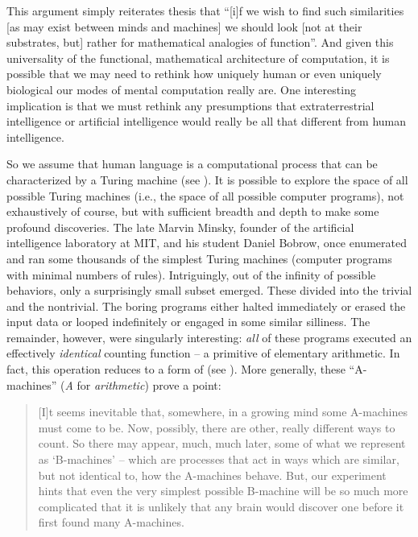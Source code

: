 \documentclass[output=paper]{langsci/langscibook}
\begin{document}
This argument simply reiterates  thesis that
“[i]f we wish to find such similarities [as
may exist between minds and machines] we should look [not at their substrates,
but] rather for mathematical analogies of function”.  And given this
universality of the functional, mathematical architecture of computation, it is
possible that we may need to rethink how uniquely human or even uniquely
biological our modes of mental computation really are. One interesting
implication is that we must rethink any presumptions that extraterrestrial
intelligence or artificial intelligence would really be all that different from
human intelligence.

So we assume that human language is a computational process that can be
characterized by a Turing machine (see \citealt{Watumull2015}). It is possible
to explore the space of all possible Turing machines (i.e., the space of all
possible computer programs), not exhaustively of course, but with sufficient
breadth and depth to make some profound discoveries. The late Marvin Minsky,
founder of the artificial intelligence laboratory at MIT, and his student
{Daniel Bobrow, once enumerated and ran some thousands of the
simplest Turing machines (computer programs with minimal numbers of rules).}{}
{Intriguingly, out of the infinity of possible behaviors, only a
surprisingly small subset emerged.} {These divided into the
trivial and the nontrivial.} {The boring programs either halted
immediately or erased the input data or looped indefinitely or engaged in some
similar silliness.} {The remainder, however, were singularly
interesting: \emph{all} of these programs executed an effectively
\emph{identical} counting function -- a primitive of elementary
arithmetic.} {In fact, this operation reduces to a form of 
(see \citealt{Chomsky2008}).} {More generally, these “A-machines”
(\emph{A} for \emph{arithmetic}) prove a point:}

\begin{quote}
    [I]t seems inevitable that, somewhere, in a growing mind some A-machines
    must come to be. Now, possibly, there are other, really different ways to
    count. So there may appear, much, much later, some of what we represent as
    ‘B-machines’ – which are processes that act in ways which are similar, but
    not identical to, how the A-machines behave. But, our experiment hints that
    even the very simplest possible B-machine will be so much more complicated
    that it is unlikely that any brain would discover one before it first found
    many A-machines.\hfill\hbox{\parencite[121]{Minsky1985}}
\end{quote}
\end{document}
